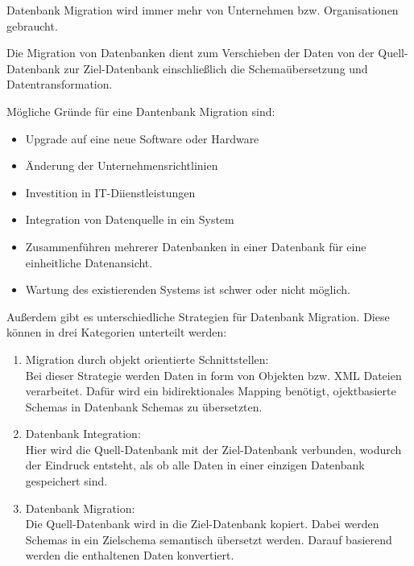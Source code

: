 


Datenbank Migration wird immer mehr von Unternehmen bzw. Organisationen gebraucht. 

Die Migration von Datenbanken dient zum Verschieben der Daten von der Quell-Datenbank zur Ziel-Datenbank einschließlich die Schemaübersetzung und Datentransformation.


Mögliche Gründe für eine Dantenbank Migration sind:
\begin{itemize}
	\item Upgrade auf eine neue Software oder Hardware
	\item Änderung der Unternehmensrichtlinien
	\item Investition in IT-Diienstleistungen
	\item Integration von Datenquelle in ein System
	\item Zusammenführen mehrerer Datenbanken in einer Datenbank für eine einheitliche Datenansicht.
	\item Wartung des existierenden Systems ist schwer oder nicht möglich.
\end{itemize}

Außerdem gibt es unterschiedliche Strategien für Datenbank Migration. Diese können in drei Kategorien unterteilt werden:

\begin{enumerate}
	\item Migration durch objekt orientierte Schnittstellen: \\
	Bei dieser Strategie werden Daten in form von Objekten bzw. XML Dateien verarbeitet. Dafür wird ein bidirektionales Mapping benötigt, ojektbasierte Schemas in Datenbank Schemas zu übersetzten.
	\item Datenbank Integration: \\
	Hier wird die Quell-Datenbank mit der Ziel-Datenbank verbunden, wodurch der Eindruck entsteht, als ob alle Daten in einer einzigen Datenbank gespeichert sind.	
	\item Datenbank Migration: \\
	Die Quell-Datenbank wird in die Ziel-Datenbank kopiert. Dabei werden Schemas in ein Zielschema semantisch übersetzt werden. Darauf basierend werden die enthaltenen Daten konvertiert.
\end{enumerate}

